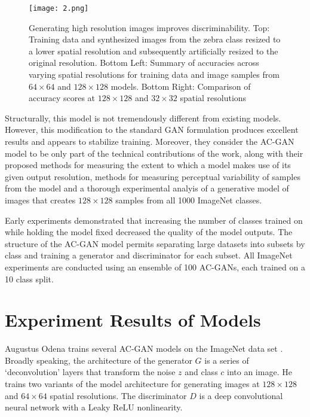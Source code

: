 \documentclass[10pt,twocolumn,letterpaper]{article}
\begin{document}
\begin{figure*}
	\begin{center}
		\texttt{[image: 2.png]}
	\end{center}
	\caption{Generating high resolution images improves discriminability. Top: Training data and synthesized images from the zebra class resized to a lower spatial resolution and subsequently artificially resized to the original resolution. Bottom Left: Summary of accuracies across varying spatial resolutions for training data and image samples from $64\times 64$ and $128\times 128$ models. Bottom Right: Comparison of accuracy scores at $128\times 128$ and $32\times 32$ spatial resolutions}
	\label{p2}
\end{figure*}

Structurally, this model is not tremendously different from existing models. However, this modification to the standard GAN formulation produces excellent results and appears to stabilize training. Moreover, they consider the AC-GAN model to be only part of the technical contributions of the work, along with their proposed methods for measuring the extent to which a model makes use of its given output resolution, methods for measuring perceptual variability of samples from the model and a thorough experimental analyis of a generative model of images that creates $128\times 128$ samples from all 1000 ImageNet classes.

Early experiments demonstrated that increasing the number of classes trained on while holding the model fixed decreased the quality of the model outputs. The structure of the AC-GAN model permits separating large datasets into subsets by class and training a generator and discriminator for each subset. All ImageNet experiments are conducted using an ensemble of 100 AC-GANs, each trained on a 10 class split.

\section{Experiment Results of Models}

Augustus Odena trains several AC-GAN models on the ImageNet data set \cite{Russakovsky2015ImageNet}. Broadly speaking, the architecture of the generator $G$ is a series of `deconvolution' layers that transform the noise $z$ and class $c$ into an image. He trains two variants of the model architecture for generating images at $128\times 128$ and $64\times 64$ spatial resolutions. The discriminator $D$ is a deep convolutional neural network with a Leaky ReLU nonlinearity.
\end{document}
